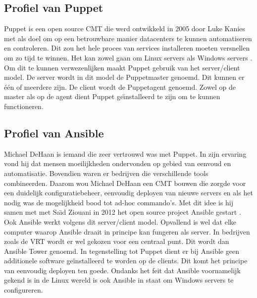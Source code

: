 \subsection{Profiel van Puppet}
Puppet is een open source \gls{CMT} die werd ontwikkeld in 2005 door Luke Kanies \autocite{PuppetLeaders} met als doel om op een betrouwbare manier datacenters te kunnen automatiseren en controleren. Dit zou het hele proces van services installeren moeten versnellen om zo tijd te winnen\autocite{how-puppet-works}. Het kan zowel gaan om Linux servers als Windows servers \autocite{PuppetForWindows}. Om dit te kunnen verwezenlijken maakt Puppet gebruik van  het server/client model. De server wordt in dit model de Puppetmaster genoemd. Dit kunnen er  \'e\'en of meerdere zijn.  De client wordt de Puppetagent genoemd. Zowel op de master als op de agent dient Puppet ge{\"\i}nstalleerd te zijn om te kunnen functioneren. \autocite{puppetdoc} \autocite{puppetfaq}


\subsection{Profiel van Ansible}
Michael DeHaan is iemand die zeer vertrouwd was met Puppet. In zijn ervaring vond hij dat mensen moeilijkheden ondervonden op gebied van eenvoud en automatisatie. Bovendien waren er bedrijven die verschillende tools combineerden. Daarom wou Michael DeHaan een \gls{CMT} bouwen die zorgde voor een duidelijk configuratiebeheer, eenvoudig deployen van nieuwe servers en als het nodig was de mogelijkheid bood tot ad-hoc commando's. Met dit idee is hij samen met met Sa{\"\i}d Ziouani in 2012 het open source project Ansible gestart \autocite{ansiblefordevops}. Ook Ansible werkt volgens dit server/client model. Opvallend is wel dat elke computer waarop Ansible draait in principe kan fungeren als server. In bedrijven zoals de VRT wordt er wel gekozen voor een centraal punt. Dit wordt dan Ansible Tower genoemd. In tegenstelling tot Puppet dient er bij Ansible geen additionele software ge\"installeerd te worden op de clients. Dit komt het principe van eenvoudig deployen  ten goede. Ondanks het feit dat Ansible voornamelijk gekend is in de Linux wereld is ook Ansible in staat om Windows servers te configureren. \autocite{ansibleforwindows}









